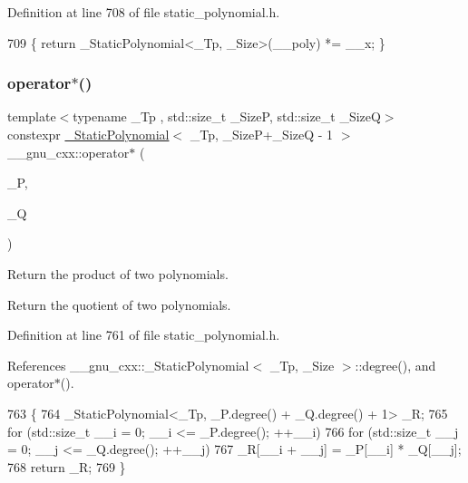 Definition at line 708 of file static\+\_\+polynomial.\+h.


\begin{DoxyCode}
709     \{ \textcolor{keywordflow}{return} \_StaticPolynomial<\_Tp, \_Size>(\_\_poly) *= \_\_x; \}
\end{DoxyCode}
\mbox{\label{namespace____gnu__cxx_a8570f2d82260e7f64d985be3ddf007f8}} 
\subsubsection{\texorpdfstring{operator$\ast$()}{operator*()}\hspace{0.1cm}{\footnotesize\ttfamily [3/6]}}
{\footnotesize\ttfamily template$<$typename \+\_\+\+Tp , std\+::size\+\_\+t \+\_\+\+SizeP, std\+::size\+\_\+t \+\_\+\+SizeQ$>$ \\
constexpr \hyperlink{class____gnu__cxx_1_1__StaticPolynomial}{\+\_\+\+Static\+Polynomial}$<$ \+\_\+\+Tp, \+\_\+\+SizeP+\+\_\+\+SizeQ -\/ 1 $>$ \+\_\+\+\_\+gnu\+\_\+cxx\+::operator$\ast$ (\begin{DoxyParamCaption}\item[{const \hyperlink{class____gnu__cxx_1_1__StaticPolynomial}{\+\_\+\+Static\+Polynomial}$<$ \+\_\+\+Tp, \+\_\+\+SizeP $>$ \&}]{\+\_\+P,  }\item[{const \hyperlink{class____gnu__cxx_1_1__StaticPolynomial}{\+\_\+\+Static\+Polynomial}$<$ \+\_\+\+Tp, \+\_\+\+SizeQ $>$ \&}]{\+\_\+Q }\end{DoxyParamCaption})\hspace{0.3cm}{\ttfamily [inline]}}

Return the product of two polynomials.

Return the quotient of two polynomials. 

Definition at line 761 of file static\+\_\+polynomial.\+h.



References \+\_\+\+\_\+gnu\+\_\+cxx\+::\+\_\+\+Static\+Polynomial$<$ \+\_\+\+Tp, \+\_\+\+Size $>$\+::degree(), and operator$\ast$().


\begin{DoxyCode}
763     \{
764       \_StaticPolynomial<\_Tp, \_P.degree() + \_Q.degree() + 1> \_R;
765       \textcolor{keywordflow}{for} (std::size\_t \_\_i = 0; \_\_i <= \_P.degree(); ++\_\_i)
766         \textcolor{keywordflow}{for} (std::size\_t \_\_j = 0; \_\_j <= \_Q.degree(); ++\_\_j)
767           \_R[\_\_i + \_\_j] = \_P[\_\_i] * \_Q[\_\_j];
768       \textcolor{keywordflow}{return} \_R;
769     \}
\end{DoxyCode}
\mbox{\label{namespace____gnu__cxx_a1d0b1e9322fd407848b43cecab1ab9ae}} 
